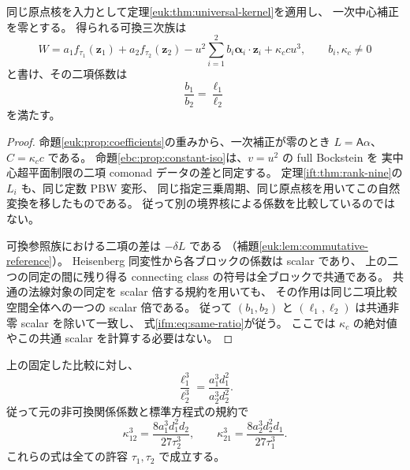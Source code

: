 \begin{lemma}[全係数比較で用いる二項尺度]
\label{ifm:lem:same-bockstein}
同じ原点核を入力として定理\ref{euk:thm:universal-kernel}を適用し、
一次中心補正を零とする。
得られる可換三次族は
\begin{equation}\label{ifm:eq:comparison-family}
 W=a_1f_{\tau_1}(\mathbf z_1)+a_2f_{\tau_2}(\mathbf z_2)
       -u^2\sum_{i=1}^2 b_i\boldsymbol\alpha_i\cdot\mathbf z_i
       +\kappa_c c u^3,
 \qquad b_i,\kappa_c\ne0
\end{equation}
と書け、その二項係数は
\begin{equation}\label{ifm:eq:same-ratio}
                          \frac{b_1}{b_2}=\frac{\ell_1}{\ell_2}
\end{equation}
を満たす。
\end{lemma}

\begin{proof}
命題\ref{euk:prop:coefficients}の重みから、一次補正が零のとき
$L=\mathsf A\alpha$、$C=\kappa_c c$ である。
命題\ref{ebc:prop:constant-iso}は、$v=u^2$ の full Bockstein を
実中心超平面制限の二項 comonad データの差と同定する。
定理\ref{ift:thm:rank-nine}の $L_i$ も、同じ定数 PBW 変形、
同じ指定三乗周期、同じ原点核を用いてこの自然変換を移したものである。
従って別の境界核による係数を比較しているのではない。

可換参照族における二項の差は $-\delta L$ である
（補題\ref{euk:lem:commutative-reference}）。
Heisenberg 同変性から各ブロックの係数は scalar であり、
上の二つの同定の間に残り得る connecting class の符号は全ブロックで共通である。
共通の法線対象の同定を scalar 倍する規約を用いても、
その作用は同じ二項比較空間全体への一つの scalar 倍である。
従って $(b_1,b_2)$ と $(\ell_1,\ell_2)$ は共通非零 scalar を除いて一致し、
式\eqref{ifm:eq:same-ratio}が従う。
ここでは $\kappa_c$ の絶対値やこの共通 scalar を計算する必要はない。
\end{proof}

\begin{theorem}[異なる二因子の混合尺度の三乗]
\label{ifm:thm:scale-cubes}
上の固定した比較に対し、
\begin{equation}\label{ifm:eq:ell-ratio}
 \frac{\ell_1^3}{\ell_2^3}
       =\frac{a_1^3d_1^2}{a_2^3d_2^2}.
\end{equation}
従って元の非可換関係係数と標準方程式の規約で
\begin{equation}\label{ifm:eq:mixed-cubes}
 \boxed{\quad
 \kappa_{12}^3=\frac{8a_1^3d_1^2d_2}{27\tau_2^3},\qquad
 \kappa_{21}^3=\frac{8a_2^3d_2^2d_1}{27\tau_1^3}.
 \quad}
\end{equation}
これらの式は全ての許容 $\tau_1,\tau_2$ で成立する。
\end{theorem}


